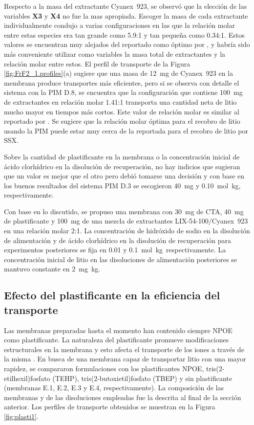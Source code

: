 Respecto a la masa del extractante Cyanex~923, se observó que la elección de las variables \textbf{X3} y \textbf{X4} no fue la mas apropiada. Escoger la masa de cada extractante individualmente condujo a varias configuraciones en las que la relación molar entre estas especies era tan grande como 5.9:1 y tan pequeña como 0.34:1. Estos valores se encuentran muy alejados del reportado como óptimo por \citet{Pranolo2015}, y habría sido más conveniente utilizar como variables la masa total de extractantes y la relación molar entre estos. El perfil de transporte de la Figura \ref{fig:FrF2_1.profiles}(a)  sugiere que una masa de 12~mg de Cyanex~923 en la membrana produce transportes más eficientes, pero si se observa con detalle el sistema con la PIM D.8, se encuentra que la configuración que contiene 100~mg de extractantes en relación molar 1.41:1 transporta una cantidad neta de litio mucho mayor en tiempos más cortos. Este valor  de relación molar es similar al reportado por \citet{Pranolo2015}. Se sugiere que la relación molar óptima para el recobro de litio usando la PIM puede estar muy cerca de la reportada para el recobro de litio por \ac{SSX}.

Sobre la cantidad de plastificante en la membrana o la concentración inicial de ácido clorhídrico en la disolución de recuperación, no hay indicios que sugieran que un valor es mejor que el otro pero debió tomarse una decisión y con base en los buenos resultados del sistema PIM D.3 se escogieron 40~mg y 0.10~mol~kg\mnn, respectivamente.

Con base en lo discutido, se propuso una membrana con 30~mg de CTA, 40~mg de plastificante y 100~mg de una mezcla de extractantes LIX-54-100/Cyanex~923 en una relación molar 2:1. La concentración de hidróxido de sodio en la disolución de alimentación y de ácido clorhídrico en la disolución de recuperación para experimentos posteriores se fija en 0.01 y 0.1~mol~kg\mnn\, res\-pec\-tivamente. La concentración inicial de litio en las disoluciones de alimentación posteriores se mantuvo constante en 2~mg~kg\mnn.

\subsection{Efecto del plastificante en la eficiencia del transporte}
Las membranas preparadas hasta el momento han contenido siempre \ac{NPOE} como plastificante. La naturaleza del plastificante promueve modificaciones estructurales en la membrana y esto afecta el transporte de los iones a través de la misma \citep{RodriguezdeSanMiguel2008}. En busca de una membrana capaz de transportar litio con una mayor rapidez, se compararon formulaciones con los plastificantes \ac{NPOE}, tris(2-etilhexil)fosfato (TEHP), tris(2-butoxietil)fosfato (TBEP)  y sin plastificante (membranas E.1, E.2, E.3 y E.4, respectivamente). La composición de las membranas y de las disoluciones empleadas fue la descrita al final de la sección anterior. Los perfiles de transporte obtenidos se muestran en la Figura \ref{fig:plasti1}.

